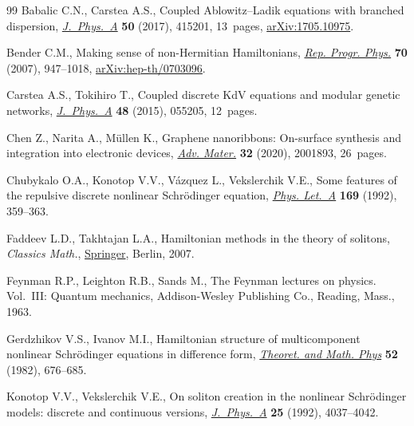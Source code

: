 \documentclass[pdftex]{sigma}
\numberwithin{equation}{section}
\begin{document}
\begin{thebibliography}{99}
Babalic C.N., Carstea A.S., Coupled {A}blowitz--{L}adik equations with branched
 dispersion,
 \href{https://doi.org/10.1088/1751-8121/aa87a4}{\textit{J.~Phys.~A}}
 \textbf{50} (2017), 415201, 13~pages,
 \href{http://arxiv.org/abs/1705.10975}{arXiv:1705.10975}.

Bender C.M., Making sense of non-{H}ermitian {H}amiltonians,
 \href{https://doi.org/10.1088/0034-4885/70/6/R03}{\textit{Rep. Progr. Phys.}}
 \textbf{70} (2007), 947--1018,
 \href{http://arxiv.org/abs/hep-th/0703096}{arXiv:hep-th/0703096}.

Carstea A.S., Tokihiro T., Coupled discrete {K}d{V} equations and modular
 genetic networks,
 \href{https://doi.org/10.1088/1751-8113/48/5/055205}{\textit{J.~Phys.~A}}
 \textbf{48} (2015), 055205, 12~pages.

Chen Z., Narita A., M\"ullen K., Graphene nanoribbons: On-surface synthesis and
 integration into electronic devices,
 \href{https://doi.org/10.1002/adma.202001893}{\textit{Adv. Mater.}}
 \textbf{32} (2020), 2001893, 26~pages.

Chubykalo O.A., Konotop V.V., V\'azquez L., Vekslerchik V.E., Some features of
 the repulsive discrete nonlinear Schr\"odinger equation,
 \href{https://doi.org/10.1016/0375-9601(92)90241-D}{\textit{Phys. Let.~A}}
 \textbf{169} (1992), 359--363.

Faddeev L.D., Takhtajan L.A., Hamiltonian methods in the theory of solitons,
 \textit{Classics Math.}, \href{https://doi.org/10.1007/978-3-540-69969-9}{Springer},
 Berlin, 2007.

Feynman R.P., Leighton R.B., Sands M., The {F}eynman lectures on physics.
 {V}ol.~{III}: {Q}uantum mechanics, Addison-Wesley
 Publishing Co., Reading, Mass., 1963.

Gerdzhikov V.S., Ivanov M.I., {H}amiltonian structure of multicomponent
 nonlinear {S}chr\"odinger equations in difference form,
 \href{https://doi.org/10.1007/BF01027788}{\textit{Theoret. and Math. Phys}}
 \textbf{52} (1982), 676--685.

Konotop V.V., Vekslerchik V.E., On soliton creation in the nonlinear
 {S}chr\"odinger models: discrete and continuous versions,
 \href{https://doi.org/10.1088/0305-4470/25/14/018}{\textit{J.~Phys.~A}}
 \textbf{25} (1992), 4037--4042.


\end{thebibliography}
\end{document}
